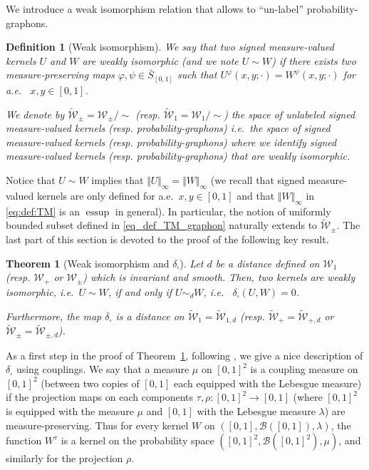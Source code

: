 \documentclass{amsart}
\newcommand{\aE}{a.e.\ }
\newcommand{\ie}{i.e.\ }
\theoremstyle{plain}
\newtheorem{theo}[Th]{Theorem}
\newtheorem{defin}[Th]{Definition}
\theoremstyle{definition}
\newcommand{\signed}{\pm}
\newcommand{\Graphon}{\mathcal{W}_1}
\newcommand{\Kernel}{\mathcal{W}_{\signed}}
\newcommand{\Kernelp}{\mathcal{W}_{+}}
\newcommand{\UGraphon}{\widetilde{\mathcal{W}}_1}
\newcommand{\UGraphond}{\widetilde{\mathcal{W}}_{1,d}}
\newcommand{\UKernel}{\widetilde{\mathcal{W}}_{\signed}}
\newcommand{\UKerneld}{\widetilde{\mathcal{W}}_{\signed,d}}
\newcommand{\UKernelpd}{\widetilde{\mathcal{W}}_{+,d}}
\newcommand{\UKernelp}{\widetilde{\mathcal{W}}_{+}}
\newcommand{\TM}[1]{\norm{#1}_\infty}
\newcommand{\Relabel}{\bar{S}_{[0,1]}}
\newcommand{\simd}{\sim_{d}}
\newcommand{\dd}{\delta_{\square}}
\newcommand{\norm}[1]{\Vert#1\Vert}
\DeclareMathOperator*{\esssup}{\mathrm{essup}}
\begin{document}
We introduce a weak isomorphism relation that allows to ``un-label'' probability-graphons.

\begin{defin}[Weak isomorphism]\label{def_weak_isomorphism}
We say that two signed measure-valued kernels $U$ and $W$ are \emph{weakly isomorphic}
(and we note $U\sim W$)
if there exists two measure-preserving maps $\varphi, \psi\in\Relabel$
such that $U^\varphi(x,y; \cdot) = W^\psi(x,y;\cdot)$ for \aE
$x,y\in [0,1]$.

We denote by $\UKernel=\Kernel / \sim$ (resp. $\UGraphon=\Graphon / \sim$)
the space of unlabeled signed measure-valued kernels (resp. probability-graphons)
\ie the space of signed measure-valued kernels (resp. probability-graphons) where
we identify signed measure-valued kernels (resp. probability-graphons) that are weakly
isomorphic. 
\end{defin}

Notice that $U\sim W$ implies that $\TM{U}=\TM{W}$
(we recall that signed measure-valued kernels are only defined 
	for \aE $x,y\in [0,1]$
	and that $\TM{W}$ in \eqref{eq:def:TM} is an $\esssup$ in general).
In particular, the notion of uniformly bounded subset 
	defined in \eqref{eq_def_TM_graphon} naturally extends
	to $\UKernel$.
The last part of this section is devoted to the proof of the following
key result. 

\begin{theo}[Weak isomorphism and $\dd$]
   \label{theo:Wm=W}
   Let $d$ be a distance defined on $\Graphon$ (resp.  $\Kernelp$ or $\Kernel$)
   which is invariant  and smooth.  Then, two
   kernels are weakly isomorphic, \ie $U \sim W$, if and only if
   $U \simd W$, \emph{\ie}  $\dd(U,W) = 0$.

   Furthermore, the map $\dd$ is a distance on $\UGraphon=\UGraphond$
   (resp. $\UKernelp=\UKernelpd$ or $\UKernel=\UKerneld$).
\end{theo}

As a first step in the proof of Theorem~\ref{theo:Wm=W}, 
following \cite{Lovasz},
we give a nice description of $\dd$ using couplings. 
We say  that a  measure $\mu$  on $[0,  1]^2$ is  a coupling  measure on
$[0,  1]^2$  (between two  copies  of  $[0,1]$  each equipped  with  the
Lebesgue   measure)  if   the   projection  maps   on  each   components
$\tau, \rho :  [0,1]^2 \to [0,1]$ (where $[0,1]^2$ is  equipped with the
measure  $\mu$  and  $[0,1]$  with the  Lebesgue  measure $\lambda$)  are  measure-preserving.       
Thus      for       every      kernel      $W$      on
$([0,1],\mathcal{B}([0,1]),\lambda)$,  
the  function   $W^{\tau}$  is  a
kernel  on the  probability space  $([0,1]^2,\mathcal{B}([0,1]^2),\mu)$,
and similarly for the projection $\rho$.
\end{document}
